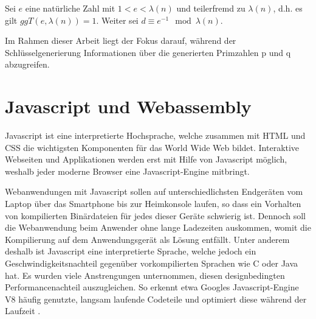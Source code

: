 Sei $e$ eine natürliche Zahl mit $1<e<\lambda(n)$ und teilerfremd zu $\lambda(n)$, d.h. es gilt $ggT(e,\lambda(n)) = 1$. Weiter sei $d \equiv e^{-1} \mod \lambda(n)$.

Im Rahmen dieser Arbeit liegt der Fokus darauf, während der Schlüsselgenerierung Informationen über die generierten Primzahlen p und q abzugreifen.











\section{Javascript und Webassembly}

Javascript ist eine interpretierte Hochsprache, welche zusammen mit HTML und CSS die wichtigsten Komponenten für das World Wide Web bildet. 
Interaktive Webseiten und Applikationen werden erst mit Hilfe von Javascript möglich, weshalb jeder moderne Browser eine Javascript-Engine mitbringt.

Webanwendungen mit Javascript sollen auf unterschiedlichsten Endgeräten vom Laptop über das Smartphone bis zur Heimkonsole laufen, so dass ein Vorhalten von kompilierten Binärdateien für jedes dieser Geräte schwierig ist. 
Dennoch soll die Webanwendung beim Anwender ohne lange Ladezeiten auskommen, womit die Kompilierung auf dem Anwendungsgerät als Lösung entfällt.
Unter anderem deshalb ist Javascript eine interpretierte Sprache, welche jedoch ein Geschwindigkeitsnachteil gegenüber vorkompilierten Sprachen wie C oder Java hat.
Es wurden viele Anstrengungen unternommen, diesen designbedingten Performancenachteil auszugleichen. 
So erkennt etwa Googles Javascript-Engine V8 häufig genutzte, langsam laufende Codeteile und optimiert diese während der Laufzeit \cite{GoogleTurboFan}.

